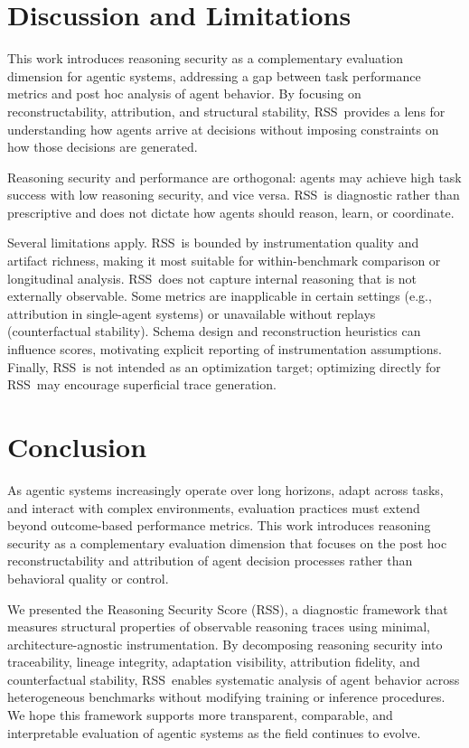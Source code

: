 \documentclass[11pt]{article}
\newcommand{\RSS}{\textsc{RSS}}
\begin{document}
\section{Discussion and Limitations}
This work introduces reasoning security as a complementary evaluation dimension for agentic systems, addressing a gap between task performance metrics and post hoc analysis of agent behavior. By focusing on reconstructability, attribution, and structural stability, \RSS\ provides a lens for understanding how agents arrive at decisions without imposing constraints on how those decisions are generated.

Reasoning security and performance are orthogonal: agents may achieve high task success with low reasoning security, and vice versa. \RSS\ is diagnostic rather than prescriptive and does not dictate how agents should reason, learn, or coordinate.

Several limitations apply. \RSS\ is bounded by instrumentation quality and artifact richness, making it most suitable for within-benchmark comparison or longitudinal analysis. \RSS\ does not capture internal reasoning that is not externally observable. Some metrics are inapplicable in certain settings (e.g., attribution in single-agent systems) or unavailable without replays (counterfactual stability). Schema design and reconstruction heuristics can influence scores, motivating explicit reporting of instrumentation assumptions. Finally, \RSS\ is not intended as an optimization target; optimizing directly for \RSS\ may encourage superficial trace generation.

\section{Conclusion}
As agentic systems increasingly operate over long horizons, adapt across tasks, and interact with complex environments, evaluation practices must extend beyond outcome-based performance metrics. This work introduces reasoning security as a complementary evaluation dimension that focuses on the post hoc reconstructability and attribution of agent decision processes rather than behavioral quality or control.

We presented the Reasoning Security Score (\RSS), a diagnostic framework that measures structural properties of observable reasoning traces using minimal, architecture-agnostic instrumentation. By decomposing reasoning security into traceability, lineage integrity, adaptation visibility, attribution fidelity, and counterfactual stability, \RSS\ enables systematic analysis of agent behavior across heterogeneous benchmarks without modifying training or inference procedures. We hope this framework supports more transparent, comparable, and interpretable evaluation of agentic systems as the field continues to evolve.
\end{document}
